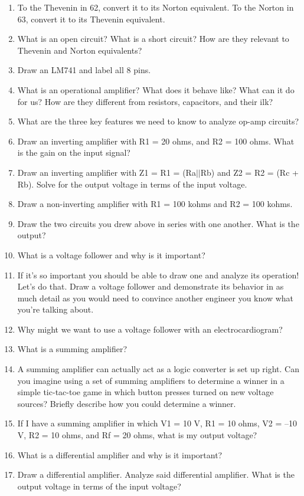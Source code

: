 \documentclass[11pt]{book}
\begin{document}
\begin{enumerate}
	\item To the Thevenin in 62, convert it to its Norton equivalent. To the Norton in 63, convert it to its Thevenin equivalent.\
	\item What is an open circuit? What is a short circuit? How are they relevant to Thevenin and Norton equivalents?
	\item Draw an LM741 and label all 8 pins.
	\item What is an operational amplifier? What does it behave like? What can it do for us? How are they different from resistors, capacitors, and their ilk?
	\item What are the three key features we need to know to analyze op-amp circuits?
	\item Draw an inverting amplifier with R1 = 20 ohms, and R2 = 100 ohms. What is the gain on the input signal?
	\item Draw an inverting amplifier with Z1 = R1 = (Ra$\vert\vert$Rb) and Z2 = R2 = (Rc + Rb). Solve for the output voltage in terms of the input voltage.
	\item Draw a non-inverting amplifier with R1 = 100 kohms and R2 = 100 kohms.
	\item Draw the two circuits you drew above in series with one another. What is the output?
	\item What is a voltage follower and why is it important?
	\item If it’s so important you should be able to draw one and analyze its operation! Let’s do that. Draw a voltage follower and demonstrate its behavior in as much detail as you would need to convince another engineer you know what you’re talking about.
	\item Why might we want to use a voltage follower with an electrocardiogram?
	\item What is a summing amplifier?
	\item A summing amplifier can actually act as a logic converter is set up right. Can you imagine using a set of summing amplifiers to determine a winner in a simple tic-tac-toe game in which button presses turned on new voltage sources? Briefly describe how you could determine a winner.
	\item If I have a summing amplifier in which V1 = 10 V, R1 = 10 ohms, V2 = –10 V, R2 = 10 ohms, and Rf = 20 ohms, what is my output voltage?
	\item What is a differential amplifier and why is it important?
	\item Draw a differential amplifier. Analyze said differential amplifier. What is the output voltage in terms of the input voltage?

\end{enumerate}
\end{document}
